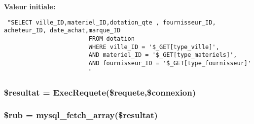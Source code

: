{\bf Valeur initiale:}

\footnotesize\begin{verbatim} "SELECT ville_ID,materiel_ID,dotation_qte , fournisseur_ID, acheteur_ID, date_achat,marque_ID
                        FROM dotation
                        WHERE ville_ID = '$_GET[type_ville]',
                        AND materiel_ID = '$_GET[type_materiels]',
                        AND fournisseur_ID = '$_GET[type_fournisseur]'
                        "
\end{verbatim}\normalsize 
\hypertarget{materiel_2affiche__stock_8php_a2}{
\subsubsection[\$resultat]{\setlength{\rightskip}{0pt plus 5cm}\$resultat = Exec\-Requete(\$requete,\$connexion)}}
\label{materiel_2affiche__stock_8php_a2}


\hypertarget{materiel_2affiche__stock_8php_a3}{
\subsubsection[\$rub]{\setlength{\rightskip}{0pt plus 5cm}\$rub = mysql\_\-fetch\_\-array(\$resultat)}}
\label{materiel_2affiche__stock_8php_a3}


